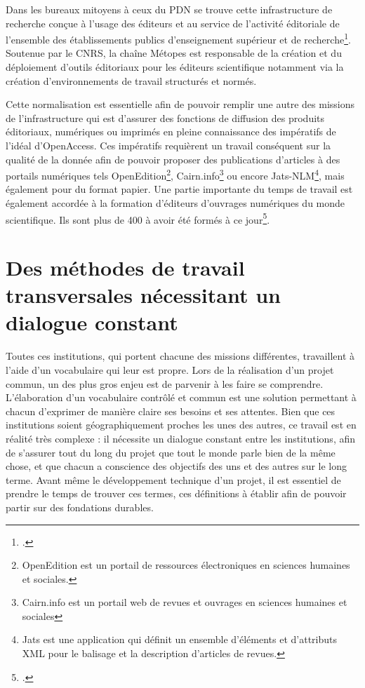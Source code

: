 \documentclass[a4paper,12pt,twoside]{book}
\begin{document}
    Dans les bureaux mitoyens à ceux du \acrshort{PDN} se trouve cette infrastructure de recherche conçue \og à l'usage des éditeurs et au service de l'activité éditoriale de l'ensemble des établissements publics d'enseignement supérieur et de recherche\footcite{Métopes}\fg. Soutenue par le CNRS, la chaîne Métopes est responsable de la création et du déploiement d'outils éditoriaux pour les éditeurs scientifique notamment via la création d'environnements de travail structurés et normés.
    
    Cette normalisation est essentielle afin de pouvoir remplir une autre des missions de l'infrastructure qui est d'assurer des fonctions de diffusion des produits éditoriaux, numériques ou imprimés en pleine connaissance des impératifs de l'idéal d'OpenAccess. Ces impératifs requièrent un travail conséquent sur la qualité de la donnée afin de pouvoir proposer des publications d'articles à des portails numériques tels OpenEdition\footnote{OpenEdition est un portail de ressources électroniques en sciences humaines et sociales.}, Cairn.info\footnote{Cairn.info est un portail web de revues et ouvrages en sciences humaines et sociales} ou encore Jats-NLM\footnote{Jats est une application qui définit un ensemble d'éléments et d'attributs XML pour le balisage et la description d'articles de revues.}, mais également pour du format papier. Une partie importante du temps de travail est également accordée à la formation d'éditeurs d'ouvrages numériques du monde scientifique. Ils sont plus de 400 à avoir été formés à ce jour\footcite{Métopes}.
    
    \section{Des méthodes de travail transversales nécessitant un dialogue constant}
    
     Toutes ces institutions, qui portent chacune des missions différentes, travaillent à l'aide d'un vocabulaire qui leur est propre. Lors de la réalisation d'un projet commun, un des plus gros enjeu est de parvenir à les faire se comprendre. L'élaboration d'un vocabulaire contrôlé et commun est une solution permettant à chacun d'exprimer de manière claire ses besoins et ses attentes.
     Bien que ces institutions soient géographiquement proches les unes des autres, ce travail est en réalité très complexe : il nécessite un dialogue constant entre les institutions, afin de s'assurer tout du long du projet que tout le monde parle bien de la même chose, et que chacun a conscience des objectifs des uns et des autres sur le long terme.
     Avant même le développement technique d'un projet, il est essentiel de prendre le temps de trouver ces termes, ces définitions à établir afin de pouvoir partir sur des fondations durables. 
     
\end{document}
